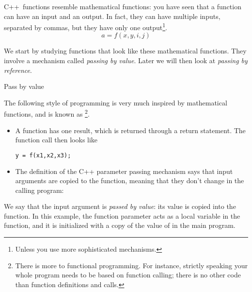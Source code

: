 
C++~functions resemble mathematical functions: you have seen that a
function can have an input and an output. In fact, they can have
multiple inputs, separated by commas, but they have only one
output\footnote{Unless you use more sophisticated mechanisms.}.
\[ a = f(x,y,i,j) \]

We start by studying functions that look like these mathematical
functions. They involve a  mechanism
called
\emph{passing by value}.
%
Later we will then look at
\emph{passing by reference}.

 {Pass by value}

The following style of programming is very much inspired by
mathematical functions, and is known as \footnote {There is more to functional programming. For
  instance, strictly speaking your whole program needs to be based on
  function calling; there is no other code than function definitions
  and calls.}.
\begin{itemize}
\item A function has one result, which is returned through a return
  statement. The function call then looks like
\begin{lstlisting}
y = f(x1,x2,x3);
\end{lstlisting}
\item The definition of the C++ parameter passing mechanism says that
  input arguments are copied to the function, meaning that they don't
  change in the calling program:

\end{itemize}

We say that the input argument is
\emph{passed by value}:
its value is copied into the
function.  In this example, the function parameter  acts as a
local variable in the function, and it is initialized with a copy of
the value of  in the main program.

